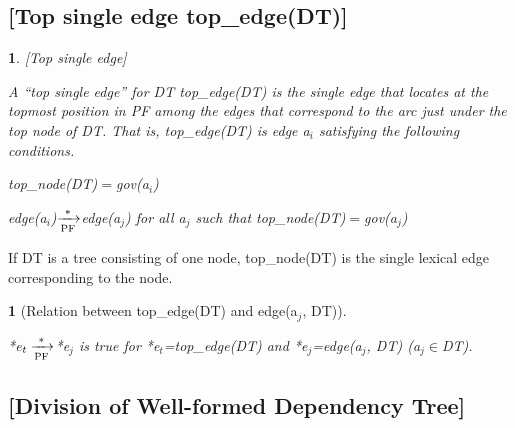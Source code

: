 \documentclass[english]{jnlp_1.4_rep}
\theoremstyle{break}
\theoremstyle{plain}
\newtheorem{lemma}{}[]
\newcommand{\proof}[1]{}
\theoremstyle{plain}
\newtheorem{definition}{}
\begin{document}
\subsection*{[Top single edge top\_edge(DT)]}

\begin{definition}\label{def:TopSingEdge}[Top single edge]

A ``top single edge'' for DT top\_edge(DT) is the single edge that
locates at the topmost position in PF among the edges that correspond
to the arc just under the top node of DT. That is, top\_edge(DT) is
edge a$_i$ satisfying the following conditions.

top\_node(DT)$=$gov(a$_i$) 

edge(a$_i$)${\xrightarrow[{\rm PF}]{*}}$edge(a$_j$) for all a$_j$ such that top\_node(DT)$=$gov(a$_j$)

\end{definition}

If DT is a tree consisting of one node, top\_node(DT) is the single
lexical edge corresponding to the node.

\begin{lemma}[Relation between top\_edge(DT) and edge(a$_j$, DT)]
\label{lem:RelBetweenTopedgeAndEdge}

*e$_t \xrightarrow[{\rm PF}]{*}$*e$_j$ is true for *e$_t$=top\_edge(DT) and *e$_j$=edge(a$_j$, DT) (a$_j \in$DT).

\proof{
If a$_j$ is an arc just under the top node of DT, i.e.,
gov(a$_j$)$=$top\_node(DT), *e$_t\xrightarrow[{\rm PF}]{*}$*e$_j$,
is true, according to Lemma \ref{lem:app2-3} and the definition of
top\_edge. If not, a$_j$ is a descendant of one of the arcs just under
the top node of DT. *e$_t\xrightarrow[{\rm PF}]{*}$*e$_j$ is true,
according to Lemma \ref{lem:app2-4}.\\
}
\end{lemma}


\subsection*{[Division of Well-formed Dependency Tree]}
\end{document}
